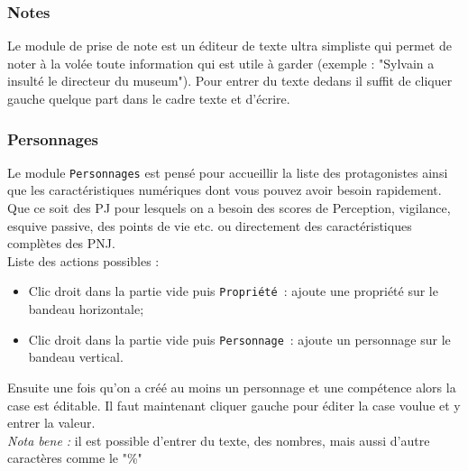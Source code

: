 \documentclass[a4paper,12pt]{article}
\newcommand*{\interfaceitem}[1]{\texttt{#1}}
\begin{document}
\subsubsection{Notes}
Le module de prise de note est un éditeur de texte ultra simpliste qui permet de noter à la volée toute information qui est utile à garder (exemple : "Sylvain a insulté le directeur du museum"). Pour entrer du texte dedans il suffit de cliquer gauche quelque part dans le cadre texte et d'écrire.
\\

\subsubsection{Personnages}\label{personnage}
Le module \interfaceitem{Personnages} est pensé pour accueillir la liste des protagonistes ainsi que les caractéristiques numériques dont vous pouvez avoir besoin rapidement. Que ce soit des PJ pour lesquels on a besoin des scores de Perception, vigilance, esquive passive, des points de vie etc. ou directement des caractéristiques complètes des PNJ.
\\
Liste des actions possibles :
\begin{itemize}
    \item Clic droit dans la partie vide puis \interfaceitem{Propriété}~: ajoute une propriété sur le bandeau horizontale;
    \item Clic droit dans la partie vide puis \interfaceitem{Personnage}~: ajoute un personnage sur le bandeau vertical.
\end{itemize}
Ensuite une fois qu'on a créé au moins un personnage et une compétence alors la case est éditable. Il faut maintenant cliquer gauche pour éditer la case voulue et y entrer la valeur.
\\\emph{Nota bene :} il est possible d'entrer du texte, des nombres, mais aussi d'autre caractères comme le "\%"
\end{document}
